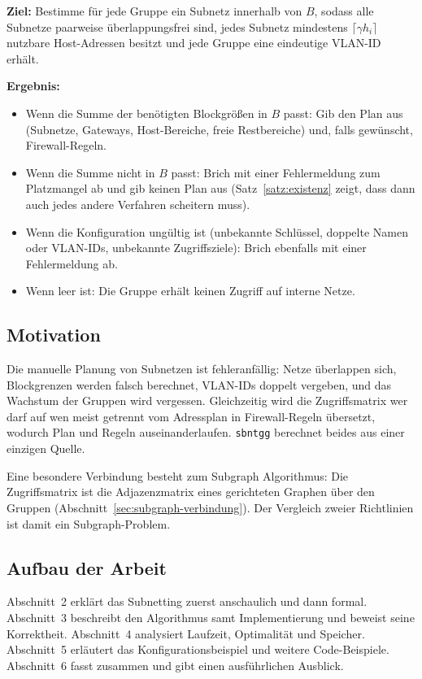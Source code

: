 \documentclass[a4paper,12pt]{article}
\theoremstyle{definition}
\newcommand{\code}[1]{\texttt{\detokenize{#1}}}
\begin{document}
\textbf{Ziel:} Bestimme für jede Gruppe ein Subnetz innerhalb von $B$, sodass alle Subnetze paarweise überlappungsfrei sind, jedes Subnetz mindestens $\lceil \gamma h_i \rceil$ nutzbare Host-Adressen besitzt und jede Gruppe eine eindeutige VLAN-ID erhält.

\textbf{Ergebnis:}
\begin{itemize}
	\item Wenn die Summe der benötigten Blockgrößen in $B$ passt: Gib den Plan aus (Subnetze, Gateways, Host-Bereiche, freie Restbereiche) und, falls gewünscht, Firewall-Regeln.
	\item Wenn die Summe nicht in $B$ passt: Brich mit einer Fehlermeldung zum Platzmangel ab und gib keinen Plan aus (Satz~\ref{satz:existenz} zeigt, dass dann auch jedes andere Verfahren scheitern muss).
	\item Wenn die Konfiguration ungültig ist (unbekannte Schlüssel, doppelte Namen oder VLAN-IDs, unbekannte Zugriffsziele): Brich ebenfalls mit einer Fehlermeldung ab.
	\item Wenn \code{access} leer ist: Die Gruppe erhält keinen Zugriff auf interne Netze.
\end{itemize}

\subsection{Motivation}

Die manuelle Planung von Subnetzen ist fehleranfällig: Netze überlappen sich, Blockgrenzen werden falsch berechnet, VLAN-IDs doppelt vergeben, und das Wachstum der Gruppen wird vergessen. Gleichzeitig wird die Zugriffsmatrix \glqq wer darf auf wen\grqq{} meist getrennt vom Adressplan in Firewall-Regeln übersetzt, wodurch Plan und Regeln auseinanderlaufen. \texttt{sbntgg} berechnet beides aus einer einzigen Quelle.

Eine besondere Verbindung besteht zum Subgraph Algorithmus: Die Zugriffsmatrix ist die Adjazenzmatrix eines gerichteten Graphen über den Gruppen (Abschnitt~\ref{sec:subgraph-verbindung}). Der Vergleich zweier Richtlinien ist damit ein Subgraph-Problem.

\subsection{Aufbau der Arbeit}

Abschnitt~2 erklärt das Subnetting zuerst anschaulich und dann formal. Abschnitt~3 beschreibt den Algorithmus samt Implementierung und beweist seine Korrektheit. Abschnitt~4 analysiert Laufzeit, Optimalität und Speicher. Abschnitt~5 erläutert das Konfigurationsbeispiel und weitere Code-Beispiele. Abschnitt~6 fasst zusammen und gibt einen ausführlichen Ausblick.
\end{document}
